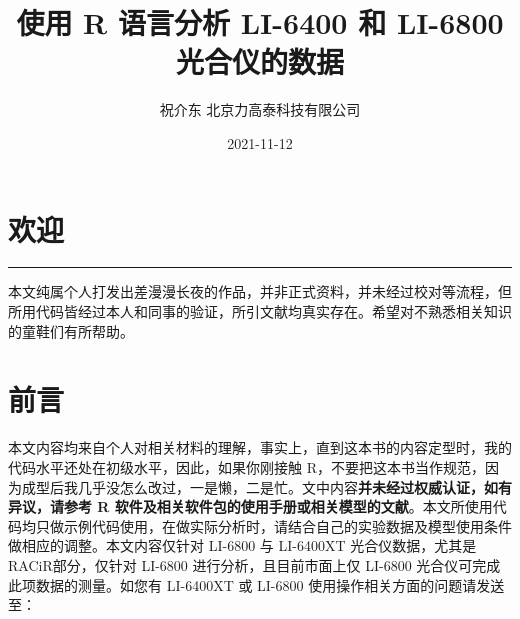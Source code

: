 \documentclass[
]{krantz}
\title{使用 R 语言分析 LI-6400 和 LI-6800 光合仪的数据}
\author{祝介东 北京力高泰科技有限公司}
\date{2021-11-12}
\begin{document}
\maketitle





\thispagestyle{empty}

\setlength{\abovedisplayskip}{-5pt}
\setlength{\abovedisplayshortskip}{-5pt}

{
\hypersetup{linkcolor=}
\setcounter{tocdepth}{2}
\tableofcontents
}
\listoffigures
\listoftables
\hypertarget{welcome}{%
\chapter*{欢迎}\label{welcome}}


\begin{center}\rule{0.5\linewidth}{0.5pt}\end{center}

本文纯属个人打发出差漫漫长夜的作品，并非正式资料，并未经过校对等流程，但所用代码皆经过本人和同事的验证，所引文献均真实存在。希望对不熟悉相关知识的童鞋们有所帮助。

\frontmatter

\hypertarget{frontmatter}{%
\chapter*{前言}\label{frontmatter}}


本文内容均来自个人对相关材料的理解，事实上，直到这本书的内容定型时，我的代码水平还处在初级水平，因此，如果你刚接触 R，不要把这本书当作规范，因为成型后我几乎没怎么改过，一是懒，二是忙。文中内容\textbf{并未经过权威认证，如有异议，请参考 R 软件及相关软件包的使用手册或相关模型的文献}。本文所使用代码均只做示例代码使用，在做实际分析时，请结合自己的实验数据及模型使用条件做相应的调整。本文内容仅针对
LI-6800 与 LI-6400XT 光合仪数据，尤其是 RACiR\texttrademark 部分，仅针对 LI-6800
进行分析，且目前市面上仅 LI-6800 光合仪可完成此项数据的测量。如您有 LI-6400XT 或 LI-6800 使用操作相关方面的问题请发送至：
\end{document}
